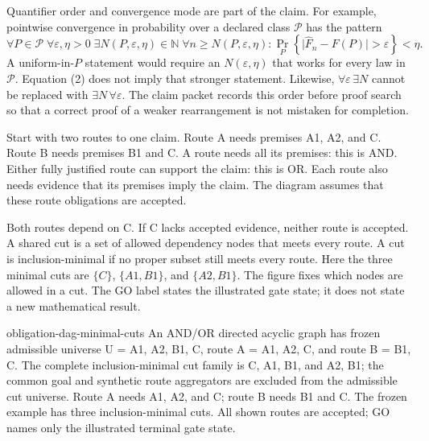 \documentclass[11pt]{article}
\begin{document}
Quantifier order and convergence mode are part of the claim.  For example, pointwise convergence
in probability over a declared class \(\mathcal P\) has the pattern
\[
  \forall P\in\mathcal P\;\forall\varepsilon,\eta>0\;
  \exists N(P,\varepsilon,\eta)\in\mathbb N\;
  \forall n\ge N(P,\varepsilon,\eta):
  \Pr_P\!\left\{\bigl|\widehat F_n-F(P)\bigr|>\varepsilon\right\}<\eta.
  \tag{2}
\]
A uniform-in-\(P\) statement would require an \(N(\varepsilon,\eta)\) that works for every law in
\(\mathcal P\).  Equation (2) does not imply that stronger statement.  Likewise,
\(\forall\varepsilon\,\exists N\) cannot be replaced with
\(\exists N\,\forall\varepsilon\).  The claim packet records this order before proof search so that
a correct proof of a weaker rearrangement is not mistaken for completion.

Start with two routes to one claim. Route A needs premises A1, A2, and C. Route B needs
premises B1 and C. A route needs all its premises: this is AND. Either fully justified route
can support the claim: this is OR. Each route also needs evidence that its premises imply
the claim. The diagram assumes that these route obligations are accepted.

Both routes depend on C. If C lacks accepted evidence, neither route is accepted. A shared
cut is a set of allowed dependency nodes that meets every route. A cut is inclusion-minimal
if no proper subset still meets every route. Here the three minimal cuts are
\(\{C\}\), \(\{A1,B1\}\), and \(\{A2,B1\}\). The figure fixes which nodes are allowed in a cut.
The GO label states the illustrated gate state; it does not state a new mathematical result.

\PidWorkflowFigure
  {obligation-dag-minimal-cuts}
  {An AND/OR directed acyclic graph has frozen admissible universe U = {A1, A2, B1, C}, route A = {A1, A2, C}, and route B = {B1, C}. The complete inclusion-minimal cut family is {C}, {A1, B1}, and {A2, B1}; the common goal and synthetic route aggregators are excluded from the admissible cut universe.}
  {Route A needs A1, A2, and C; route B needs B1 and C. The frozen example has three inclusion-minimal cuts. All shown routes are accepted; GO names only the illustrated terminal gate state.}
\FloatBarrier

\end{document}
